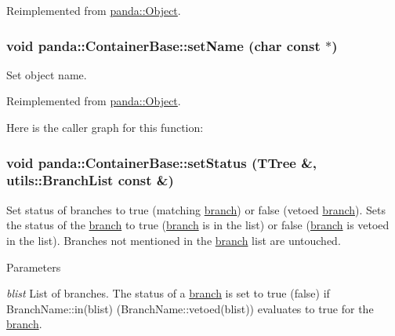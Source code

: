 Reimplemented from \hyperlink{classpanda_1_1Object_aed9f9d3b6abe518dd27957de843b36b5}{panda::Object}.\hypertarget{classpanda_1_1ContainerBase_a43e10c3e6286b03ba6906f843318d88a}{
\subsubsection[{setName}]{\setlength{\rightskip}{0pt plus 5cm}void panda::ContainerBase::setName (char const $\ast$)}}
\label{classpanda_1_1ContainerBase_a43e10c3e6286b03ba6906f843318d88a}


Set object name. 

Reimplemented from \hyperlink{classpanda_1_1Object_a7bba3813f78065be847cd8d85bab93fc}{panda::Object}.

Here is the caller graph for this function:\hypertarget{classpanda_1_1ContainerBase_ac3eae6e2461489f5453fe0680dc2481c}{
\subsubsection[{setStatus}]{\setlength{\rightskip}{0pt plus 5cm}void panda::ContainerBase::setStatus (TTree \&, \/  {\bf utils::BranchList} const \&)}}
\label{classpanda_1_1ContainerBase_ac3eae6e2461489f5453fe0680dc2481c}


Set status of branches to true (matching \hyperlink{namespacepanda_1_1branch}{branch}) or false (vetoed \hyperlink{namespacepanda_1_1branch}{branch}). Sets the status of the \hyperlink{namespacepanda_1_1branch}{branch} to true (\hyperlink{namespacepanda_1_1branch}{branch} is in the list) or false (\hyperlink{namespacepanda_1_1branch}{branch} is vetoed in the list). Branches not mentioned in the \hyperlink{namespacepanda_1_1branch}{branch} list are untouched.


\begin{DoxyParams}{Parameters}
\item[{\em blist}]List of branches. The status of a \hyperlink{namespacepanda_1_1branch}{branch} is set to true (false) if BranchName::in(blist) (BranchName::vetoed(blist)) evaluates to true for the \hyperlink{namespacepanda_1_1branch}{branch}. \end{DoxyParams}


